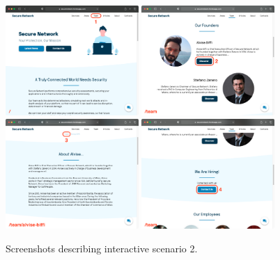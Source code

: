 \documentclass[12pt]{report}
\begin{document}
\begin{figure}[H]
	\centering
	\includegraphics[width=0.45\textwidth]{scenarios/2/1.png}
	\includegraphics[width=0.45\textwidth]{scenarios/2/2.png}
	\includegraphics[width=0.45\textwidth]{scenarios/2/3.png}
	\includegraphics[width=0.45\textwidth]{scenarios/2/4.png}
	\caption{Screenshots describing interactive scenario 2.}
\end{figure}

\clearpage
\end{document}
